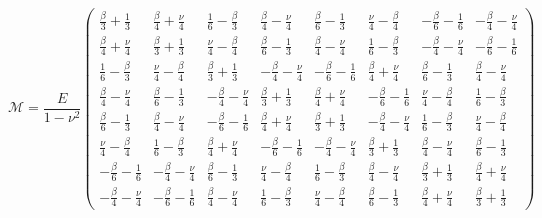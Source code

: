 \documentclass[11pt]{article}
\begin{document}
\begin{equation}
\mathcal{M} = \frac{E}{1-\nu^2}
\begin{pmatrix}
 	\frac{\beta}{3} + \frac{1}{3} &   \frac{\beta}{4} + \frac{\nu}{4} & \frac{1}{6} - \frac{\beta}{3} &   \frac{\beta}{4} - \frac{\nu}{4} & \frac{\beta}{6} - \frac{1}{3} &   \frac{\nu}{4} - \frac{\beta}{4} &  - \frac{\beta}{6} - \frac{1}{6} & - \frac{\beta}{4} - \frac{\nu}{4} \\
	\frac{\beta}{4} + \frac{\nu}{4} & \frac{\beta}{3} + \frac{1}{3} &   \frac{\nu}{4} - \frac{\beta}{4} & \frac{\beta}{6} - \frac{1}{3} &   \frac{\beta}{4} - \frac{\nu}{4} & \frac{1}{6} - \frac{\beta}{3} & - \frac{\beta}{4} - \frac{\nu}{4} &  - \frac{\beta}{6} - \frac{1}{6} \\
	\frac{1}{6} - \frac{\beta}{3} &   \frac{\nu}{4} - \frac{\beta}{4} & \frac{\beta}{3} + \frac{1}{3} & - \frac{\beta}{4} - \frac{\nu}{4} &  - \frac{\beta}{6} - \frac{1}{6} &   \frac{\beta}{4} + \frac{\nu}{4} & \frac{\beta}{6} - \frac{1}{3} &   \frac{\beta}{4} - \frac{\nu}{4} \\
	\frac{\beta}{4} - \frac{\nu}{4} & \frac{\beta}{6} - \frac{1}{3} & - \frac{\beta}{4} - \frac{\nu}{4} & \frac{\beta}{3} + \frac{1}{3} &   \frac{\beta}{4} + \frac{\nu}{4} &  - \frac{\beta}{6} - \frac{1}{6} &   \frac{\nu}{4} - \frac{\beta}{4} & \frac{1}{6} - \frac{\beta}{3} \\
	\frac{\beta}{6} - \frac{1}{3} &   \frac{\beta}{4} - \frac{\nu}{4} &  - \frac{\beta}{6} - \frac{1}{6} &   \frac{\beta}{4} + \frac{\nu}{4} & \frac{\beta}{3} + \frac{1}{3} & - \frac{\beta}{4} - \frac{\nu}{4} & \frac{1}{6} - \frac{\beta}{3} &   \frac{\nu}{4} - \frac{\beta}{4} \\
	\frac{\nu}{4} - \frac{\beta}{4} & \frac{1}{6} - \frac{\beta}{3} &   \frac{\beta}{4} + \frac{\nu}{4} &  - \frac{\beta}{6} - \frac{1}{6} & - \frac{\beta}{4} - \frac{\nu}{4} & \frac{\beta}{3} + \frac{1}{3} &   \frac{\beta}{4} - \frac{\nu}{4} & \frac{\beta}{6} - \frac{1}{3} \\
	- \frac{\beta}{6} - \frac{1}{6} & - \frac{\beta}{4} - \frac{\nu}{4} & \frac{\beta}{6} - \frac{1}{3} &   \frac{\nu}{4} - \frac{\beta}{4} & \frac{1}{6} - \frac{\beta}{3} &   \frac{\beta}{4} - \frac{\nu}{4} & \frac{\beta}{3} + \frac{1}{3} &   \frac{\beta}{4} + \frac{\nu}{4} \\
	- \frac{\beta}{4} - \frac{\nu}{4} &  - \frac{\beta}{6} - \frac{1}{6} &   \frac{\beta}{4} - \frac{\nu}{4} & \frac{1}{6} - \frac{\beta}{3} &   \frac{\nu}{4} - \frac{\beta}{4} & \frac{\beta}{6} - \frac{1}{3} &   \frac{\beta}{4} + \frac{\nu}{4} & \frac{\beta}{3} + \frac{1}{3}
\end{pmatrix}
\end{equation}
\end{document}

